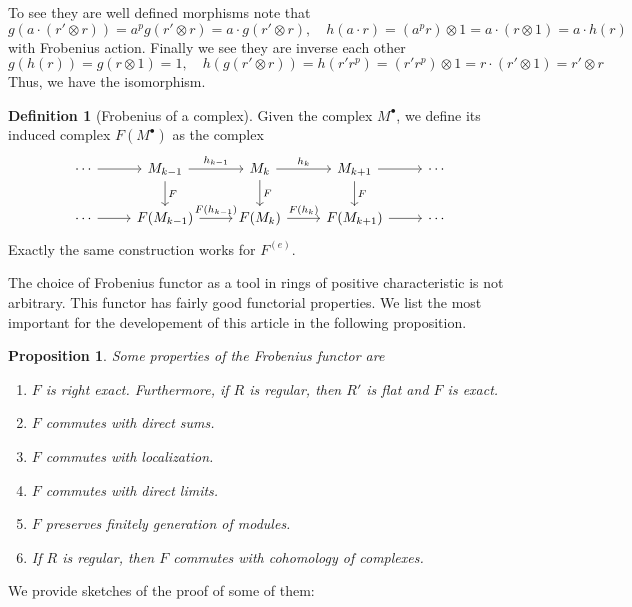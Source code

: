 \documentclass[leqno]{article}
\newtheorem{proposition}{Proposition}[section]
\theoremstyle{definition}
\newtheorem{definition}{Definition}[section]
\begin{document}
To see they are well defined morphisms note that 
\[
g(a \cdot (r'\otimes r)) = a^p g(r'\otimes r) = a\cdot g(r'\otimes r), \quad h(a\cdot r)= (a^pr)\otimes 1 = a\cdot (r \otimes 1) = a \cdot h(r)
\]
with Frobenius action. Finally we see they are inverse each other
\[
g(h(r)) = g(r\otimes 1) = 1, \quad h(g(r'\otimes r)) = h(r'r^p) = (r'r^p)\otimes 1 = r\cdot (r'\otimes 1) = r'\otimes r
\] 
Thus, we have the isomorphism.





\begin{definition}[Frobenius of a complex] Given the complex $M^{\bullet}$, we define its induced complex $F(M^{\bullet})$ as the complex
\[\begin{tikzcd}
	\cdots & {M_{k-1}} & {M_{k}} & {M_{k+1}} & \cdots \\
	\cdots & {F(M_{k-1})} & {F(M_{k})} & {F(M_{k+1})} & \cdots
	\arrow["F", from=1-2, to=2-2]
	\arrow["F", from=1-3, to=2-3]
	\arrow["F", from=1-4, to=2-4]
	\arrow["{h_{k-1}}", from=1-2, to=1-3]
	\arrow["{h_k}", from=1-3, to=1-4]
	\arrow["{F(h_{k-1})}", from=2-2, to=2-3]
	\arrow["{F(h_k)}", from=2-3, to=2-4]
	\arrow[from=1-1, to=1-2]
	\arrow[from=1-4, to=1-5]
	\arrow[from=2-4, to=2-5]
	\arrow[from=2-1, to=2-2]
\end{tikzcd}\]
Exactly the same construction works for $F ^{(e)}$.
\end{definition}

The choice of Frobenius functor as a tool in rings of positive characteristic is not arbitrary. This functor has fairly good functorial properties. We list the most important for the developement of this article in the following proposition.

\begin{proposition} Some properties of the Frobenius functor are
\begin{enumerate}[topsep=-6pt, itemsep=0pt]
  \item $F$ is right exact. Furthermore, if $R$ is regular, then $R'$ is flat and  $F$ is exact.
  \item $F$ commutes with direct sums.
  \item $F$ commutes with localization.
  \item $F$ commutes with direct limits. 
  \item $F$ preserves finitely generation of modules.
  \item If $R$ is regular, then $F$ commutes with cohomology of complexes.
\end{enumerate}
\end{proposition}
We provide sketches of the proof of some of them:
\end{document}
